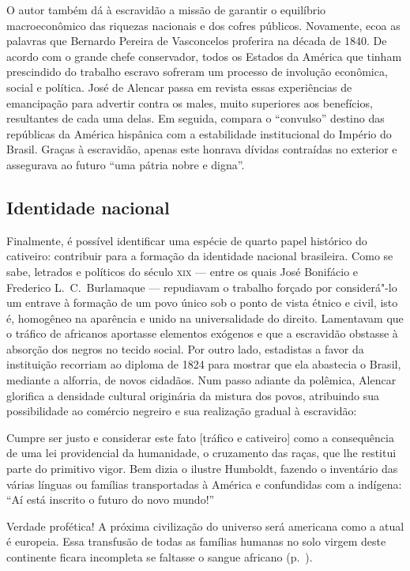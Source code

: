 O autor também dá à  escravidão a missão de garantir o equilíbrio
macroeconômico das riquezas nacionais e dos cofres públicos.
Novamente, ecoa as palavras que Bernardo Pereira de Vasconcelos
proferira na década de 1840. De acordo com o grande chefe conservador,
todos os Estados da América que tinham prescindido do trabalho escravo
sofreram um processo de involução econômica, social e política. José de
Alencar passa em revista essas experiências de emancipação para
advertir contra os males, muito superiores aos benefícios, resultantes
de cada uma delas. Em seguida, compara o ``convulso'' destino das
repúblicas da América hispânica com a estabilidade institucional do
Império do Brasil. Graças à  escravidão, apenas este honrava dívidas
contraídas no exterior e assegurava ao futuro ``uma pátria nobre e digna''. 

\subsection{Identidade nacional}

Finalmente, é possível identificar uma espécie de quarto papel histórico
do cativeiro: contribuir para a formação da identidade nacional
brasileira. Como se sabe, letrados e políticos do século \textsc{xix} --- entre os
quais José Bonifácio e Frederico L.~C.~Burlamaque --- repudiavam o
trabalho forçado por considerá"-lo um entrave à  formação de um povo
único sob o ponto de vista étnico e civil, isto é, homogêneo na
aparência e unido na universalidade do direito. Lamentavam que o
tráfico de africanos aportasse elementos exógenos e que a escravidão
obstasse à  absorção dos negros no tecido social. Por outro lado,
estadistas a favor da instituição recorriam ao diploma de 1824 para
mostrar que ela abastecia o Brasil, mediante a alforria, de novos
cidadãos. Num passo adiante da polêmica, Alencar glorifica a densidade
cultural originária da mistura dos povos, atribuindo sua possibilidade
ao comércio negreiro e sua realização gradual à  escravidão: 

\begin{hedraquote}
Cumpre ser justo e considerar este fato [tráfico e cativeiro] como a
consequência de uma lei providencial da humanidade, o cruzamento das
raças, que lhe restitui parte do primitivo vigor. Bem dizia o ilustre
Humboldt, fazendo o inventário das várias línguas ou famílias
transportadas à  América e confundidas com a indígena: ``Aí está inscrito
o futuro do novo mundo!''

Verdade profética! A próxima civilização do universo será americana como
a atual é europeia. Essa transfusão de todas as famílias humanas no
solo virgem deste continente ficara incompleta se faltasse o sangue
africano (p.~\pageref{profetica}).
\end{hedraquote}


